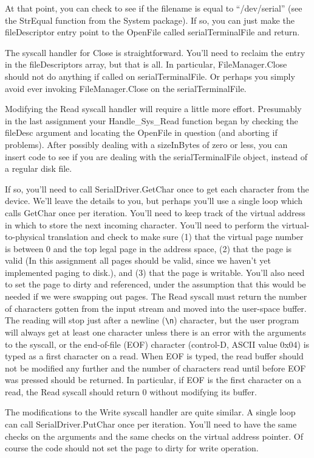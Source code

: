 \documentclass[11pt]{article}
\begin{document}
At that point, you can check to see if the filename is equal to
``/dev/serial'' (see the StrEqual function from the System package).  If
so, you can just make the fileDescriptor entry point to the OpenFile
called serialTerminalFile and return.

The syscall handler for Close is straightforward.  You'll need to
reclaim the entry in the fileDescriptors array, but that is all.  In
particular, FileManager.Close should not do anything if called on
serialTerminalFile.  Or perhaps you simply avoid ever invoking
FileManager.Close on the serialTerminalFile.

Modifying the Read syscall handler will require a little more effort.
Presumably in the last assignment your Handle\_Sys\_Read function began
by checking the fileDesc argument and locating the OpenFile in
question (and aborting if problems).  After possibly dealing with a
sizeInBytes of zero or less, you can insert code to see if you are
dealing with the serialTerminalFile object, instead of a regular disk
file.

If so, you'll need to call SerialDriver.GetChar once to get each
character from the device.  We'll leave the details to you, but
perhaps you'll use a single loop which calls GetChar once per
iteration.  You'll need to keep track of the virtual address in which
to store the next incoming character.  You'll need to perform the
virtual-to-physical translation and check to make sure (1) that the
virtual page number is between 0 and the top legal page in the address
space, (2) that the page is valid (In this assignment all pages should
be valid, since we haven't yet implemented paging to disk.), and (3)
that the page is writable.  You'll also need to set the page to dirty
and referenced, under the assumption that this would be needed if we
were swapping out pages.  The Read syscall must return the number of
characters gotten from the input stream and moved into the user-space
buffer.  The reading will stop just after a newline (\verb+\n+) character,
but the user program will always get at least one character unless
there is an error with the arguments to the syscall, or the
end-of-file (EOF) character (control-D, ASCII value 0x04) is typed as
a first character on a read.  When EOF is typed, the read buffer
should not be modified any further and the number of characters read
until before EOF was pressed should be returned. In particular, if EOF
is the first character on a read, the Read syscall should return 0
without modifying its buffer.

The modifications to the Write syscall handler are quite similar.  A
single loop can call SerialDriver.PutChar once per iteration.  You'll
need to have the same checks on the arguments and the same checks on
the virtual address pointer.  Of course the code should not set the
page to dirty for write operation.
\end{document}
